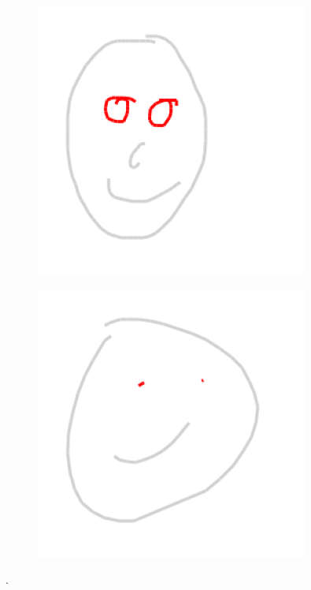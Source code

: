 \begin{figure}[!htb]
\begin{subfigure}{0.5\textwidth}
    \centering
    \includegraphics[width=0.5\linewidth]{results/contrasting_pair2_color_19.png}  
\end{subfigure}
\begin{subfigure}{0.5\textwidth}
    \centering
    \includegraphics[width=0.5\linewidth]{results/contrasting_pair2_color_102.png}   
\end{subfigure}
\caption{.}
\label{results.contrasting.sketches}
\end{figure}

